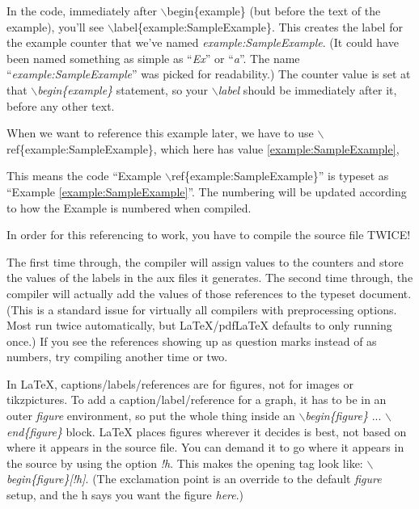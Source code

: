 \documentclass[nooutcomes]{ximera}
\begin{document}
In the code, immediately after $\backslash$begin\{example\} (but before the text of the example), you'll see 
$\backslash$label\{example:SampleExample\}. This creates the label for the 
example counter that we've named \emph{example:SampleExample}. (It could have been named something as simple as ``\emph{Ex}'' or ``\emph{a}''. 
The name ``\emph{example:SampleExample}'' was picked for readability.) 
The counter value is set at that $\backslash$\emph{begin\{example\}} statement, so your $\backslash$\emph{label} should be immediately after it,
before any other text.


When we want to reference this example later, we have to use $\backslash$ref\{example:SampleExample\}, which here has value \ref{example:SampleExample},

This means the code ``Example $\backslash$ref\{example:SampleExample\}'' is typeset as ``Example \ref{example:SampleExample}''. 
The numbering will be updated according to how the Example is numbered when compiled. 

\begin{callout}
	In order for this referencing to work, you have to compile the source file TWICE!
\end{callout}

The first time through, the compiler will assign values to the counters and store the values of the labels in the aux files it generates. The second time
through, the compiler will actually add the values of those references to the typeset document. (This is a standard issue for virtually all compilers with 
preprocessing options. Most run twice automatically, but LaTeX/pdfLaTeX  defaults to only running once.) If you see the references showing up as 
question marks instead of as numbers, try compiling another time or two.

In \LaTeX,  captions/labels/references are for figures, not for images or tikzpictures. To add a caption/label/reference for a graph, it has to be in an outer
 \emph{figure} environment, so put the whole thing inside an $\backslash$\emph{begin\{figure\}} ... $\backslash$\emph{end\{figure\}} block. 
 LaTeX  places figures wherever it decides is best, not based on where it appears in the source file. You can demand it to go where it appears in the source 
 by using the option \emph{!h}. This makes the opening tag look like: $\backslash$\emph{begin\{figure\}[!h]}. 
 (The exclamation point is an override to the default \emph{figure} setup, and the h says you want the figure \emph{here}.)
\end{document}
